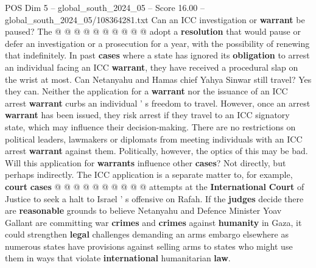 \begin{textsample}{POS Dim 5 – global\_south\_2024\_05 – Score 16.00 – global\_south\_2024\_05/108364281.txt}
Can an ICC investigation or \textbf{warrant} be paused?
The @ @ @ @ @ @ @ @ @ @ adopt a \textbf{resolution} that would pause or defer an investigation or a prosecution for a year, with the possibility of renewing that indefinitely.
In past \textbf{cases} where a state has ignored its \textbf{obligation} to arrest an individual facing an ICC \textbf{warrant}, they have received a procedural slap on the wrist at most.
Can Netanyahu and Hamas chief Yahya Sinwar still travel?
Yes they can.
Neither the application for a \textbf{warrant} nor the issuance of an ICC arrest \textbf{warrant} curbs an individual ' s freedom to travel.
However, once an arrest \textbf{warrant} has been issued, they risk arrest if they travel to an ICC signatory state, which may influence their decision-making.
There are no restrictions on political leaders, lawmakers or diplomats from meeting individuals with an ICC arrest \textbf{warrant} against them.
Politically, however, the optics of this may be bad.
Will this application for \textbf{warrants} influence other \textbf{cases}?
Not directly, but perhaps indirectly.
The ICC application is a separate matter to, for example, \textbf{court} \textbf{cases} @ @ @ @ @ @ @ @ @ @ attempts at the \textbf{International} \textbf{Court} of Justice to seek a halt to Israel ' s offensive on Rafah.
If the \textbf{judges} decide there are \textbf{reasonable} grounds to believe Netanyahu and Defence Minister Yoav Gallant are committing war \textbf{crimes} and \textbf{crimes} against \textbf{humanity} in Gaza, it could strengthen \textbf{legal} challenges demanding an arms embargo elsewhere as numerous states have provisions against selling arms to states who might use them in ways that violate \textbf{international} humanitarian \textbf{law}.

\end{textsample}
